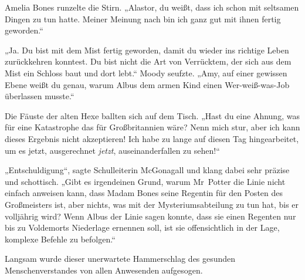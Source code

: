 Amelia Bones runzelte die Stirn.
„Alastor, du weißt, dass ich schon mit seltsamen Dingen zu tun hatte. Meiner Meinung nach bin ich ganz gut mit ihnen fertig geworden.“

„Ja. Du bist mit dem Mist fertig geworden, damit du wieder ins richtige Leben zurückkehren konntest. Du bist nicht die Art von Verrücktem, der sich aus dem Mist ein Schloss baut und dort lebt.“
Moody seufzte.
„Amy, auf einer gewissen Ebene weißt du genau, warum Albus dem armen Kind einen Wer-weiß-was-Job überlassen musste.“

Die Fäuste der alten Hexe ballten sich auf dem Tisch.
„Hast du eine Ahnung, was für eine Katastrophe das für Großbritannien wäre? Nenn mich stur, aber ich kann dieses Ergebnis nicht akzeptieren! Ich habe zu lange auf diesen Tag hingearbeitet, um es jetzt, ausgerechnet \emph{jetzt}, auseinanderfallen zu sehen!“

„Entschuldigung“, sagte Schulleiterin McGonagall und klang dabei sehr präzise und schottisch. „Gibt es irgendeinen Grund, warum Mr~Potter die Linie nicht einfach anweisen kann, dass Madam Bones seine Regentin für den Posten des Großmeisters ist, aber nichts, was mit der Mysteriumsabteilung zu tun hat, bis er volljährig wird? Wenn Albus der Linie sagen konnte, dass sie einen Regenten nur bis zu Voldemorts Niederlage ernennen soll, ist sie offensichtlich in der Lage, komplexe Befehle zu befolgen.“

Langsam wurde dieser unerwartete Hammerschlag des gesunden Menschenverstandes von allen Anwesenden aufgesogen.

